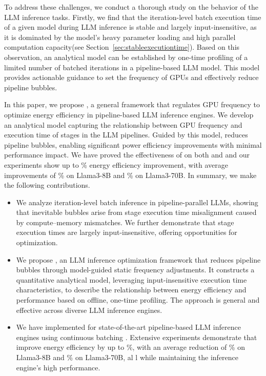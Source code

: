 To address these challenges, we conduct a thorough study on the behavior of the LLM inference tasks.
Firstly, we find that the iteration-level batch execution time of a given model during LLM inference is stable and largely input-insensitive, as it is dominated by the model’s heavy parameter loading and high parallel computation capacity(see Section~\ref{sec:stableexecutiontime}). 
Based on this observation,  an analytical model can be established by one-time profiling of a limited number of batched iterations in a pipeline-based LLM model.
This model provides actionable guidance to set the frequency of GPUs and effectively reduce pipeline bubbles. 



In this paper, we propose \thisproj{}, a general framework that regulates GPU frequency to optimize energy efficiency in pipeline-based LLM inference engines.
We develop an analytical model capturing the relationship between GPU frequency and execution time of stages in the LLM pipelines. 
Guided by this model, \thisproj{} reduces pipeline bubbles, enabling significant power efficiency improvements with minimal performance impact.
We have proved the effectiveness of \thisproj{} on both  and  and our experiments show up to \% energy efficiency improvement, with average improvements of \% on Llama3-8B and \% on Llama3-70B.
In summary, we make the following contributions.

\begin{itemize}
\item 
We analyze iteration-level batch inference in pipeline-parallel LLMs, showing that inevitable bubbles arise from stage execution time misalignment caused by compute–memory mismatches. 
We further demonstrate that stage execution times are largely input-insensitive, offering opportunities for optimization.

\item We propose \thisproj{}, an LLM inference optimization framework that reduces pipeline bubbles through model-guided static frequency adjustments.
It constructs a quantitative analytical model, leveraging input-insensitive execution time characteristics, to describe the relationship between energy efficiency and performance based on offline, one-time profiling.
The approach is general and effective across diverse LLM inference engines.

\item We have implemented \thisproj{} for state-of-the-art pipeline-based LLM inference engines using continuous batching \cite{yu2022orca}. 
Extensive experiments demonstrate that \thisproj{} improve energy efficiency by up to \%, with an average reduction of \% on Llama3-8B and \% on Llama3-70B, al  l while maintaining the inference engine's high performance.
\end{itemize}


